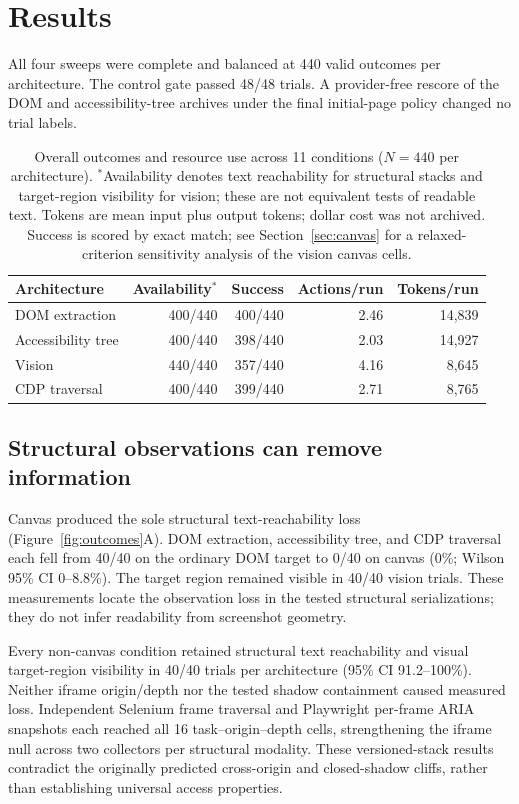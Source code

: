 \documentclass{article}
\begin{document}
\section{Results}
\label{sec:results}

All four sweeps were complete and balanced at 440 valid outcomes per architecture. The control gate passed 48/48 trials. A provider-free rescore of the DOM and accessibility-tree archives under the final initial-page policy changed no trial labels.

\begin{table}[t]
  \caption{Overall outcomes and resource use across 11 conditions ($N=440$ per architecture). $^*$Availability denotes text reachability for structural stacks and target-region visibility for vision; these are not equivalent tests of readable text. Tokens are mean input plus output tokens; dollar cost was not archived. Success is scored by exact match; see Section~\ref{sec:canvas} for a relaxed-criterion sensitivity analysis of the vision canvas cells.}
  \label{tab:overall}
  \centering
  \small
  \begin{tabular}{lrrrr}
    \toprule
    Architecture & Availability$^*$ & Success & Actions/run & Tokens/run \\
    \midrule
    DOM extraction & 400/440 & 400/440 & 2.46 & 14,839 \\
    Accessibility tree & 400/440 & 398/440 & 2.03 & 14,927 \\
    Vision & 440/440 & 357/440 & 4.16 & 8,645 \\
    CDP traversal & 400/440 & 399/440 & 2.71 & 8,765 \\
    \bottomrule
  \end{tabular}
\end{table}

\subsection{Structural observations can remove information}

Canvas produced the sole structural text-reachability loss (Figure~\ref{fig:outcomes}A). DOM extraction, accessibility tree, and CDP traversal each fell from 40/40 on the ordinary DOM target to 0/40 on canvas (0\%; Wilson 95\% CI 0--8.8\%). The target region remained visible in 40/40 vision trials. These measurements locate the observation loss in the tested structural serializations; they do not infer readability from screenshot geometry.

Every non-canvas condition retained structural text reachability and visual target-region visibility in 40/40 trials per architecture (95\% CI 91.2--100\%). Neither iframe origin/depth nor the tested shadow containment caused measured loss. Independent Selenium frame traversal and Playwright per-frame ARIA snapshots each reached all 16 task--origin--depth cells, strengthening the iframe null across two collectors per structural modality. These versioned-stack results contradict the originally predicted cross-origin and closed-shadow cliffs, rather than establishing universal access properties.
\end{document}
